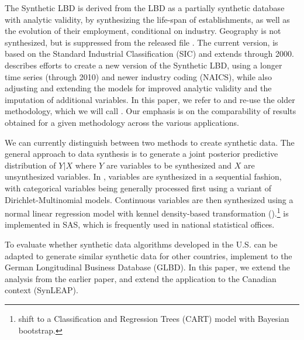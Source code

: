 

The Synthetic LBD is derived from the LBD as a partially synthetic database with analytic validity, by synthesizing the life-span of establishments, as well as the evolution of their employment, conditional on industry. Geography is not synthesized, but is suppressed from the released file \citep{RePEc:cen:tnotes:11-01}. The current version, is based on the Standard Industrial Classification (SIC) and extends through 2000. \citet{RePEc:cen:wpaper:14-12} describes efforts to create a new version of the Synthetic LBD, using a longer time  series (through 2010) and newer industry coding (NAICS), while also adjusting and extending the models for  improved  analytic validity and  the imputation of additional variables. In this paper, we refer to and re-use the older methodology, which we will call \SynLBD. Our emphasis is on the comparability of results obtained for a given methodology across the various applications.
  

We can currently distinguish between two methods to create synthetic data. The general approach to data synthesis is to generate a joint posterior predictive distribution of $Y|X$ where $Y$ are variables to be synthesized and $X$ are unsynthesized variables. In \SynLBD, variables are synthesized in a sequential fashion, with categorical variables being generally processed first using a variant of Dirichlet-Multinomial models. Continuous variables are then synthesized using a normal linear regression model with kennel density-based transformation (\textcite{WOODCOCK20094228}).\footnote{\textcite{RePEc:cen:wpaper:14-12} shift  to a Classification and Regression Trees (CART) model with Bayesian bootstrap. } \SynLBD{} is implemented in SAS\texttrademark, which is frequently used in national statistical offices.

To evaluate whether synthetic data algorithms developed in the U.S. can be adapted to generate similar synthetic data for other countries, \textcite{RePEc:cen:wpaper:14-13} implement \SynLBD{} to the German Longitudinal Business Database (GLBD). In this paper, we extend the analysis from the earlier paper, and extend the application to the Canadian context (SynLEAP). 

